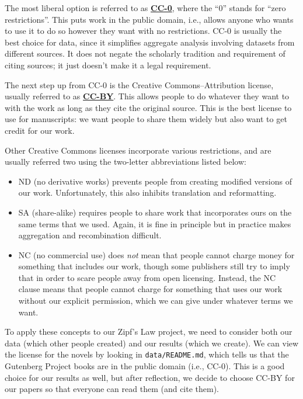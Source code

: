 \documentclass[
]{krantz}
\newcommand{\gref}[2]{\hyperlink{#2}{\textbf{#1}}}
\begin{document}
The most liberal option is referred to as \gref{CC-0}{cc\_license},
where the ``0'' stands for ``zero restrictions''.
This puts work in the public domain,
i.e.,
allows anyone who wants to use it to do so however they want with no restrictions.
CC-0 is usually the best choice for data,
since it simplifies aggregate analysis involving datasets from different sources.
It does not negate the scholarly tradition and requirement of citing sources;
it just doesn't make it a legal requirement.

The next step up from CC-0 is the Creative Commons--Attribution license,
usually referred to as \gref{CC-BY}{cc\_license}.
This allows people to do whatever they want to with the work
as long as they cite the original source.
This is the best license to use for manuscripts:
we want people to share them widely
but also want to get credit for our work.

Other Creative Commons licenses incorporate various restrictions,
and are usually referred two using the two-letter abbreviations listed below:

\begin{itemize}
\item
  ND (no derivative works) prevents people from creating modified versions of our work.
  Unfortunately, this also inhibits translation and reformatting.
\item
  SA (share-alike) requires people to share work that incorporates ours
  on the same terms that we used.
  Again,
  it is fine in principle but in practice makes aggregation and recombination difficult.
\item
  NC (no commercial use) does \emph{not} mean that people cannot charge money for something that includes our work,
  though some publishers still try to imply that in order to scare people away from open licensing.
  Instead,
  the NC clause means that people cannot charge for something that uses our work without our explicit permission,
  which we can give under whatever terms we want.
\end{itemize}

To apply these concepts to our Zipf's Law project,
we need to consider both our data (which other people created)
and our results (which we create).
We can view the license for the novels by looking in \texttt{data/README.md},
which tells us that the Gutenberg Project books are in the public domain (i.e., CC-0).
This is a good choice for our results as well,
but after reflection,
we decide to choose CC-BY for our papers
so that everyone can read them (and cite them).
\end{document}
